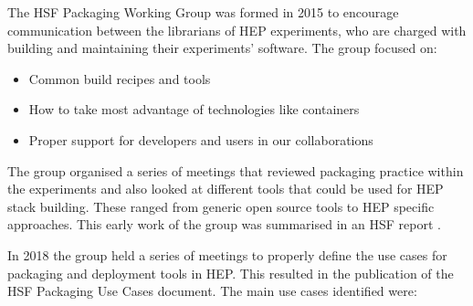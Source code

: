 \documentclass{webofc}
\begin{document}
The HSF Packaging Working Group\cite{HSFPWG} was formed in 2015 to encourage communication
between the librarians of HEP experiments, who are charged with building and
maintaining their experiments' software. The group focused on:

\begin{itemize}
    \item Common build recipes and tools
    \item How to take most advantage of technologies like containers
    \item Proper support for developers and users in our collaborations
\end{itemize}

The group organised a series of meetings that reviewed packaging
practice within the experiments and also looked at different tools that
could be used for HEP stack building. These ranged from generic open 
source tools to HEP specific approaches. This early work of the group
was summarised in an HSF report \cite{l_sexton_kennedy_2016_1472340}.

In 2018 the group held a series of meetings to properly define
the use cases for packaging and deployment tools in HEP. This resulted
in the publication of the HSF Packaging Use Cases document\cite{graeme_a_stewart_2020_3634722}.
The main use cases identified were:
\end{document}
